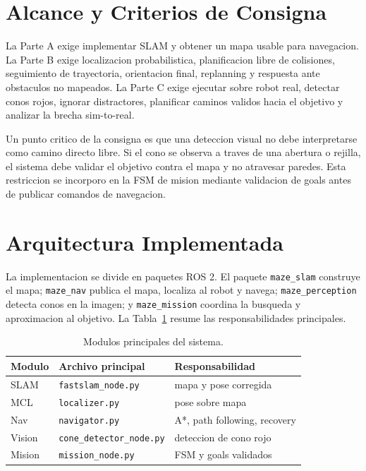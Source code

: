 \documentclass[conference]{IEEEtran}
\begin{document}
\section{Alcance y Criterios de Consigna}

La Parte A exige implementar SLAM y obtener un mapa usable para navegacion. La
Parte B exige localizacion probabilistica, planificacion libre de colisiones,
seguimiento de trayectoria, orientacion final, replanning y respuesta ante
obstaculos no mapeados. La Parte C exige ejecutar sobre robot real, detectar
conos rojos, ignorar distractores, planificar caminos validos hacia el objetivo y
analizar la brecha sim-to-real.

Un punto critico de la consigna es que una deteccion visual no debe interpretarse
como camino directo libre. Si el cono se observa a traves de una abertura o
rejilla, el sistema debe validar el objetivo contra el mapa y no atravesar
paredes. Esta restriccion se incorporo en la FSM de mision mediante validacion de
goals antes de publicar comandos de navegacion.

\section{Arquitectura Implementada}

La implementacion se divide en paquetes ROS 2. El paquete \texttt{maze\_slam}
construye el mapa; \texttt{maze\_nav} publica el mapa, localiza al robot y navega;
\texttt{maze\_perception} detecta conos en la imagen; y \texttt{maze\_mission}
coordina la busqueda y aproximacion al objetivo. La Tabla~\ref{tab:modulos}
resume las responsabilidades principales.

\begin{table}[t]
\centering
\caption{Modulos principales del sistema.}
\label{tab:modulos}
\begin{tabular}{@{}lll@{}}
\toprule
Modulo & Archivo principal & Responsabilidad \\
\midrule
SLAM & \texttt{fastslam\_node.py} & mapa y pose corregida \\
MCL & \texttt{localizer.py} & pose sobre mapa \\
Nav & \texttt{navigator.py} & A*, path following, recovery \\
Vision & \texttt{cone\_detector\_node.py} & deteccion de cono rojo \\
Mision & \texttt{mission\_node.py} & FSM y goals validados \\
\bottomrule
\end{tabular}
\end{table}
\end{document}
